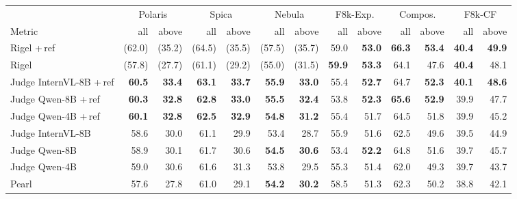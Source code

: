 \begin{tabular}{lr@{\hspace{3pt}}rr@{\hspace{3pt}}rr@{\hspace{3pt}}rr@{\hspace{3pt}}rr@{\hspace{3pt}}rr@{\hspace{3pt}}r}
\toprule
 & \multicolumn{2}{c}{Polaris} & \multicolumn{2}{c}{Spica} & \multicolumn{2}{c}{Nebula} & \multicolumn{2}{c}{F8k-Exp.} & \multicolumn{2}{c}{Compos.} & \multicolumn{2}{c}{F8k-CF} \\
\cmidrule(l{2pt}r{2pt}){2-3} \cmidrule(l{2pt}r{2pt}){4-5} \cmidrule(l{2pt}r{2pt}){6-7} \cmidrule(l{2pt}r{2pt}){8-9} \cmidrule(l{2pt}r{2pt}){10-11} \cmidrule(l{2pt}r{2pt}){12-13}
Metric & all & above & all & above & all & above & all & above & all & above & all & above \\
\midrule
Rigel +\,ref & (62.0) & (35.2) & (64.5) & (35.5) & (57.5) & (35.7) & 59.0 & \textbf{53.0} & \textbf{66.3} & \textbf{53.4} & \textbf{40.4} & \textbf{49.9} \\
Rigel & (57.8) & (27.7) & (61.1) & (29.2) & (55.0) & (31.5) & \textbf{59.9} & \textbf{53.3} & 64.1 & 47.6 & \textbf{40.4} & 48.1 \\
\addlinespace
Judge InternVL-8B +\,ref & \textbf{60.5} & \textbf{33.4} & \textbf{63.1} & \textbf{33.7} & \textbf{55.9} & \textbf{33.0} & 55.4 & \textbf{52.7} & 64.7 & \textbf{52.3} & \textbf{40.1} & \textbf{48.6} \\
Judge Qwen-8B +\,ref & \textbf{60.3} & \textbf{32.8} & \textbf{62.8} & \textbf{33.0} & \textbf{55.5} & \textbf{32.4} & 53.8 & \textbf{52.3} & \textbf{65.6} & \textbf{52.9} & 39.9 & 47.7 \\
Judge Qwen-4B +\,ref & \textbf{60.1} & \textbf{32.8} & \textbf{62.5} & \textbf{32.9} & \textbf{54.8} & \textbf{31.2} & 55.4 & 51.7 & 64.5 & 51.8 & 39.9 & 45.2 \\
Judge InternVL-8B & 58.6 & 30.0 & 61.1 & 29.9 & 53.4 & 28.7 & 55.9 & 51.6 & 62.5 & 49.6 & 39.5 & 44.9 \\
Judge Qwen-8B & 58.9 & 30.1 & 61.7 & 30.6 & \textbf{54.5} & \textbf{30.6} & 53.4 & \textbf{52.2} & 64.8 & 51.6 & 39.7 & 45.7 \\
Judge Qwen-4B & 59.0 & 30.6 & 61.6 & 31.3 & 53.8 & 29.5 & 55.3 & 51.4 & 62.0 & 49.3 & 39.7 & 43.7 \\
\addlinespace
Pearl & 57.6 & 27.8 & 61.0 & 29.1 & \textbf{54.2} & \textbf{30.2} & 58.5 & 51.3 & 62.3 & 50.2 & 38.8 & 42.1 \\

\end{tabular}
